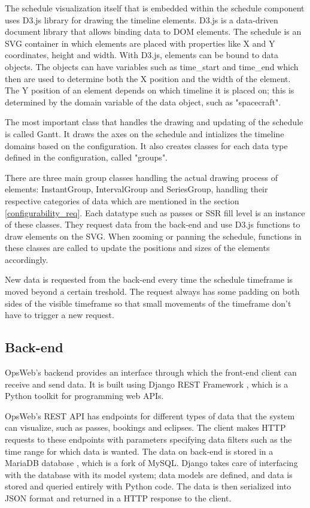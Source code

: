 The schedule visualization itself that is embedded within the schedule component uses D3.js library for drawing the timeline elements. D3.js is a data-driven document library that allows binding data to DOM elements. The schedule is an SVG container in which elements are placed with properties like X and Y coordinates, height and width. With D3.js, elements can be bound to data objects. The objects can have variables such as time\_start and time\_end which then are used to determine both the X position and the width of the element. The Y position of an element depends on which timeline it is placed on; this is determined by the domain variable of the data object, such as "spacecraft".

The most important class that handles the drawing and updating of the schedule is called Gantt. It draws the axes on the schedule and intializes the timeline domains based on the configuration. It also creates classes for each data type defined in the configuration, called "groups".

There are three main group classes handling the actual drawing process of elements: InstantGroup, IntervalGroup and SeriesGroup, handling their respective categories of data which are mentioned in the section \ref{configurability_req}. Each datatype such as passes or SSR fill level is an instance of these classes. They request data from the back-end and use D3.js functions to draw elements on the SVG. When zooming or panning the schedule, functions in these classes are called to update the positions and sizes of the elements accordingly.

New data is requested from the back-end every time the schedule timeframe is moved beyond a certain treshold. The request always has some padding on both sides of the visible timeframe so that small movements of the timeframe don't have to trigger a new request.

\cite{d3js}
\subsection{Back-end}
OpsWeb's backend provides an interface through which the front-end client can receive and send data. It is built using Django REST Framework \cite{django}, which is a Python toolkit for programming web APIs.

OpsWeb's REST API has endpoints for different types of data that the system can visualize, such as passes, bookings and eclipses. The client makes HTTP requests to these endpoints with parameters specifying data filters such as the time range for which data is wanted. The data on back-end is stored in a MariaDB database \cite{mariadb}, which is a fork of MySQL. Django takes care of interfacing with the database with its model system; data models are defined, and data is stored and queried entirely with Python code. The data is then serialized into JSON format and returned in a HTTP response to the client.

